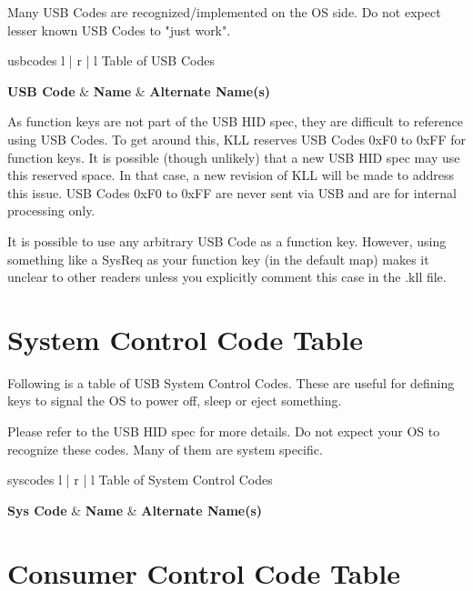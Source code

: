 \documentclass{kiibohd-template}
\begin{document}
Many USB Codes are recognized/implemented on the OS side.
Do not expect lesser known USB Codes to "just work".

\begin{ltable}{usbcodes}{ l | r | l }{Table of USB Codes}

\textbf{USB Code} & \textbf{Name} & \textbf{Alternate Name(s)} \\
\hline
\hline


\end{ltable}

As function keys are not part of the USB HID spec, they are difficult to reference using USB Codes.
To get around this, KLL reserves USB Codes 0xF0 to 0xFF for function keys.
It is possible (though unlikely) that a new USB HID spec may use this reserved space.
In that case, a new revision of KLL will be made to address this issue.
USB Codes 0xF0 to 0xFF are never sent via USB and are for internal processing only.

It is possible to use any arbitrary USB Code as a function key.
However, using something like a SysReq as your function key (in the default map) makes it unclear to other readers unless you explicitly comment this case in the .kll file.


\newpage
\chapter{System Control Code Table}
\label{chpt:SysCodeTable}

Following is a table of USB System Control Codes.
These are useful for defining keys to signal the OS to power off, sleep or eject something.

Please refer to the USB HID spec for more details.
Do not expect your OS to recognize these codes.
Many of them are system specific.

\begin{ltable}{syscodes}{ l | r | l }{Table of System Control Codes}

\textbf{Sys Code} & \textbf{Name} & \textbf{Alternate Name(s)} \\
\hline
\hline


\end{ltable}


\newpage
\chapter{Consumer Control Code Table}
\label{chpt:ConsCodeTable}
\end{document}
